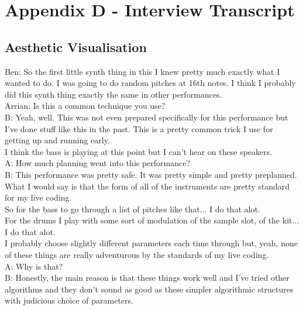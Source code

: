 \documentclass[12pt]{article}
\begin{document}
\section*{Appendix D - Interview Transcript}

\subsection*{Aesthetic Visualisation}

Ben: So the first little synth thing in this I knew pretty much exactly what I wanted to do. I was going to do random pitches at 16th notes. I think I probably did this synth thing exactly the same in other performances.\\

Arrian: Is this a common technique you use?\\

B: Yeah, well. This was not even prepared specifically for this performance but I've done stuff like this in the past. This is a pretty common trick I use for getting up and running early.\\

I think the bass is playing at this point but I can't hear on these speakers.\\

A: How much planning went into this performance?\\

B: This performance was pretty safe. It was pretty simple and pretty preplanned. What I would say is that the form of all of the instruments are pretty standard for my live coding.\\

So for the bass to go through a list of pitches like that... I do that alot.\\

For the drums I play with some sort of modulation of the sample slot, of the kit... I do that alot.\\

I probably choose slightly different parameters each time through but, yeah, none of these things are really adventurous by the standards of my live coding.\\

A: Why is that?\\

B: Honestly, the main reason is that these things work well and I've tried other algorithms and they don't sound as good as these simpler algorithmic structures with judicious choice of parameters.\\
\end{document}
